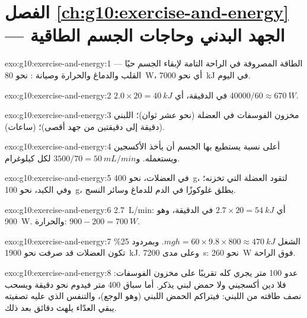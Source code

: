 \section*{الفصل \ref{ch:g10:exercise-and-energy} --- الجهد البدني وحاجات الجسم الطاقية}

\begin{solution}{exo:g10:exercise-and-energy:1}
الطاقة المصروفة في الراحة التامة لإبقاء الجسم حيًا --- القلب والدماغ
والحرارة وصيانة : نحو \qty{80}{W}، أي نحو \qty{7000}{kJ} في
اليوم.
\end{solution}

\begin{solution}{exo:g10:exercise-and-energy:2}
$2.0 \times 20 = \qty{40}{kJ}$ في الدقيقة، أي $40000/60 \approx
\qty{670}{W}$.
\end{solution}

\begin{solution}{exo:g10:exercise-and-energy:3}
مخزون الفوسفات في العضلة (نحو عشر ثوان)؛  اللبني (دقيقة إلى
دقيقتين من جهد أقصى)؛  (ساعات).
\end{solution}

\begin{solution}{exo:g10:exercise-and-energy:4}
أعلى نسبة يستطيع بها الجسم أن يأخذ الأكسجين ويستعمله.
و$3500/70 = \qty{50}{mL/min}$ لكل كيلوغرام.
\end{solution}

\begin{solution}{exo:g10:exercise-and-energy:5}
في العضلات، نحو \qty{400}{g}، لتقود العضلة التي تخزنه؛ وفي الكبد، نحو
\qty{100}{g}، يطلق غلوكوزًا في الدم للدماغ وسائر النسج.
\end{solution}

\begin{solution}{exo:g10:exercise-and-energy:6}
\qty{2.7}{L/min}: أي $2.7 \times 20 = \qty{54}{kJ}$ في الدقيقة، وهو
\qty{900}{W}. والحرارة: $900 - 200 = \qty{700}{W}$.
\end{solution}

\begin{solution}{exo:g10:exercise-and-energy:7}
الشغل $mgh = 60 \times 9.8 \times 800 \approx \qty{470}{kJ}$. وبمردود
25\% تكون العضلات قد صرفت نحو \qty{1900}{kJ}. وعلى مدى \qty{7200}{s}:
نحو \qty{260}{W} فوق الراحة.
\end{solution}

\begin{solution}{exo:g10:exercise-and-energy:8}
عدو 100 متر يجري كله تقريبًا على مخزون الفوسفات: فلا دين أكسجيني ولا
حمض لبني يذكر. أما سباق 400 متر فيدوم نحو دقيقة ويسحب نصف طاقته من
 اللبني: فيتراكم الحمض اللبني (وهو الوجع)، والتنفس الذي عليه
تصفيته يبقي العدّاء يلهث دقائق بعد ذلك.
\end{solution}

